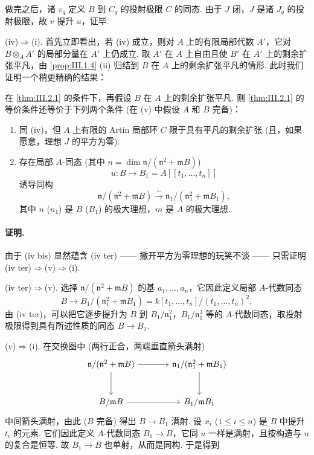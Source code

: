 做完之后，诸 $v_q$ 定义 $B$ 到 $C_q$ 的投射极限 $C$ 的同态. 由于 $J$ 闭，$J$ 是诸 $J_q$ 的投射极限，故 $v$ 提升 $u$，证毕.

(iv)$\Rightarrow$(i). 首先立即看出，若 (iv) 成立，则对 $A$ 上的有限局部代数 $A'$，它对 $B \otimes_A A'$ 的局部分量在 $A'$ 上仍成立. 取 $A'$ 在 $A$ 上自由且使 $B'$ 在 $A'$ 上的剩余扩张平凡，由 \ref{prop:III.1.4} (ii) 归结到 $B$ 在 $A$ 上的剩余扩张平凡的情形. 此时我们证明一个稍更精确的结果：

\begin{corollary}\label{cor:III.2.2}
在 \ref{thm:III.2.1} 的条件下，再假设 $B$ 在 $A$ 上的剩余扩张平凡. 则 \ref{thm:III.2.1} 的等价条件还等价于下列两个条件 (在 (v) 中假设 $A$ 和 $B$ 完备)：
\begin{enumerate}[(iv ter)]
\item[(iv ter)] 同 (iv)，但 $A$ 上有限的 Artin 局部环 $C$ 限于具有平凡的剩余扩张 (且，如果愿意，理想 $J$ 的平方为零).
\item[(v)] 存在局部 $A$-同态 (其中 $n = \dim \mathfrak{n}/(\mathfrak{n}^2 + \mathfrak{m}B)$)
\[
u \colon B \longrightarrow B_1 = A[\![t_1, \dots, t_n]\!]
\]
诱导同构
\[
\mathfrak{n}/(\mathfrak{n}^2 + \mathfrak{m}B) \stackrel{\sim}{\longrightarrow} \mathfrak{n}_1/(\mathfrak{n}_1^2 + \mathfrak{m}B_1),
\]
其中 $n$ ($n_1$) 是 $B$ ($B_1$) 的极大理想，$m$ 是 $A$ 的极大理想.
\end{enumerate}
\end{corollary}

\paragraph*{证明.} 由于 (iv bis) 显然蕴含 (iv ter) —— 撇开平方为零理想的玩笑不谈 —— 只需证明 (iv ter)$\Rightarrow$(v)$\Rightarrow$(i).

(iv ter)$\Rightarrow$(v). 选择 $\mathfrak{n}/(\mathfrak{n}^2 + \mathfrak{m}B)$ 的基 $a_1, \dots, a_n$，它因此定义局部 $A$-代数同态
\[
B \longrightarrow B_1/(\mathfrak{n}_1^2 + \mathfrak{m}B_1) = k[t_1, \dots, t_n]/(t_1, \dots, t_n)^2,
\]
由 (iv ter)，可以把它逐步提升为 $B$ 到 $B_1/\mathfrak{n}_1^2$，$B_1/\mathfrak{n}_1^3$ 等的 $A$-代数同态，取投射极限得到具有所述性质的同态 $B \to B_1$.

(v)$\Rightarrow$(i). 在交换图中 (两行正合，两端垂直箭头满射)
\[
\begin{tikzcd}[row sep=large, column sep=large]
\mathfrak{n}/(\mathfrak{n}^2 + \mathfrak{m}B) \arrow[r] \arrow[d] & \mathfrak{n}_1/(\mathfrak{n}_1^2 + \mathfrak{m}B_1) \arrow[d] \\
B/\mathfrak{m}B \arrow[r] & B_1/\mathfrak{m}B_1
\end{tikzcd}
\]
中间箭头满射，由此 ($B$ 完备) 得出 $B \to B_1$ 满射. 设 $x_i$ ($1 \leqslant i \leqslant n$) 是 $B$ 中提升 $t_i$ 的元素. 它们因此定义 $A$-代数同态 $B_1 \to B$，它同 $u$ 一样是满射，且按构造与 $u$ 的复合是恒等. 故 $B_1 \to B$ 也单射，从而是同构. 于是得到

